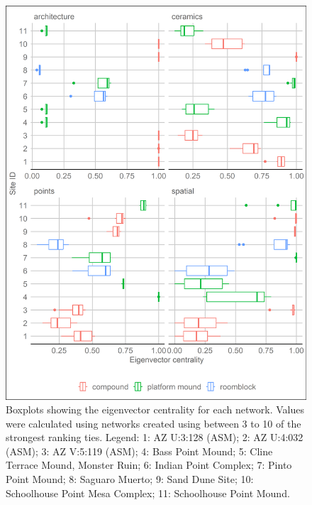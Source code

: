\documentclass[]{interact}
\theoremstyle{plain}%
\theoremstyle{definition}
\theoremstyle{remark}
\begin{document}
\begin{figure}
\includegraphics[width=1\linewidth]{figures/TontoNetworksEigenvector} \caption{Boxplots showing the eigenvector centrality for each network. Values were calculated using networks created using between 3 to 10 of the strongest ranking ties. Legend: 1: AZ U:3:128 (ASM); 2: AZ U:4:032 (ASM); 3: AZ V:5:119 (ASM); 4: Bass Point Mound; 5: Cline Terrace Mound, Monster Ruin; 6: Indian Point Complex; 7: Pinto Point Mound; 8: Saguaro Muerto; 9: Sand Dune Site; 10: Schoolhouse Point Mesa Complex; 11: Schoolhouse Point Mound.}\label{fig:TontoNetworksEigenvector}
\end{figure}
\end{document}

